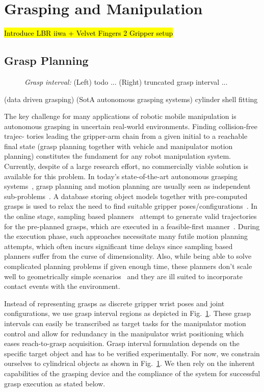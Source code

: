 \section{Grasping and Manipulation}
\label{sec:manip}
%
\hl{Introduce LBR iiwa + Velvet Fingers 2 Gripper setup}
%
\subsection{Grasp Planning}
\begin{figure}[t!] 
   \centering
     
   \caption{\textit{Grasp interval:} (Left) todo ... (Right) truncated grasp interval ...} 
   \label{fig:grasp_interval}
\end{figure}
%
\cite{Bohg14}(data driven grasping) (SotA autonomous grasping systems) \cite{Pas13} cylinder shell
fitting

The key challenge for many applications of robotic mobile manipulation is autonomous grasping in
uncertain real-world environments. Finding collision-free trajec- tories leading the gripper-arm
chain from a given initial to a reachable final state (grasp planning together with vehicle and
manipulator motion planning) constitutes the fundament for any robot manipulation system. Currently,
despite of a large research effort, no commercially viable solution is available for this
problem. In today’s state-of-the-art autonomous grasping systems~\cite{Bere07, Srin10, Krug14a},
grasp planning and motion planning are usually seen as independent sub-problems~\cite{Dian10}. A
database storing object models together with pre-computed grasps is used to relax the need to find
suitable gripper poses/configurations~\cite{Mill04, Gold11, Krug14a}. In the online stage, sampling
based planners~\cite{LaVa06} attempt to generate valid trajectories for the pre-planned grasps,
which are executed in a feasible-first manner~\cite{Bere07}. During the execution phase, such
approaches necessitate many futile motion planning attempts, which often incurs significant time
delays since sampling based planners suffer from the curse of dimensionality. Also, while being able
to solve complicated planning problems if given enough time, these planners don’t scale well to
geometrically simple scenarios~\cite{Ratl09} and they are ill suited to incorporate contact events
with the environment.

 Instead of representing grasps as discrete gripper wrist poses and joint
configurations, we use grasp interval regions as depicted in Fig.~\ref{fig:grasp_interval}. These
grasp intervals can easily be transcribed as target tasks for the manipulator motion control and
allow for redundancy in the manipulator wrist positioning which eases reach-to-grasp
acquisition. Grasp interval formulation depends on the specific target object and has to be verified
experimentally. For now, we constrain ourselves to cylindrical objects as shown in
Fig.~\ref{fig:grasp_interval}. We then rely on the inherent capabilities of the grasping device and
the compliance of the system for successful grasp execution as stated below.


